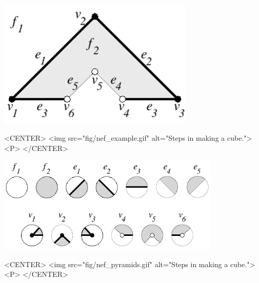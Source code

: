 \begin{minipage}[t]{0.5\textwidth}
\begin{ccTexOnly}
    \begin{center}
      \parbox{0.7\textwidth}{%
          \includegraphics[width=0.70\textwidth]{Nef_3/fig/nef_example}%
      }
    \end{center}
\end{ccTexOnly}

\begin{ccHtmlOnly}
    <CENTER>
        <img src="fig/nef_example.gif" alt="Steps in making a cube."><P>
    </CENTER>
\end{ccHtmlOnly}
\end{minipage}
\begin{minipage}[t]{0.5\textwidth}
\begin{ccTexOnly}
    \begin{center}
      \parbox{0.8\textwidth}{%
          \includegraphics[width=0.80\textwidth]{Nef_3/fig/nef_pyramids}%
      }
    \end{center}
\end{ccTexOnly}

\begin{ccHtmlOnly}
    <CENTER>
        <img src="fig/nef_pyramids.gif" alt="Steps in making a cube."><P>
    </CENTER>
\end{ccHtmlOnly}
\end{minipage}

